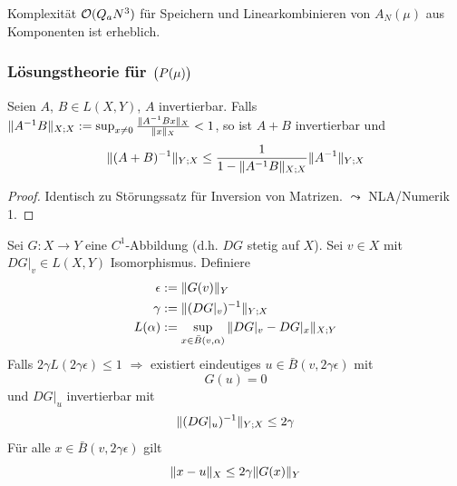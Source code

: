\begin{bem}
	Komplexität $\mathcal O(Q_a N^3)$ für Speichern und Linearkombinieren von $A_N(\mu)$ aus Komponenten ist erheblich.
\end{bem}

\subsubsection*{Lösungstheorie für $\big(P(\mu)\big)$}

\begin{satz} \label{5.3}
	Seien $A$, $B \in L(X,Y)$, $A$ invertierbar.
	Falls $\|A^{-1}B\|_{X;X} := \sup_{x \neq 0} \frac{\|A^{-1}Bx\|_X}{\|x\|_X} < 1$, so ist $A + B$ invertierbar und
	\[
		\|(A+B)^{-1}\|_{Y;X} \leq \frac{1}{1-\|A^{-1}B\|_{X;X}} \|A^{-1}\|_{Y;X}
	\]

	\begin{proof}
		Identisch zu Störungssatz für Inversion von Matrizen. $\leadsto$ NLA/Numerik 1.
	\end{proof}
\end{satz}

\begin{satz} \label{5.4}
	Sei $G: X \to Y$ eine $C^1$-Abbildung (d.h. $DG$ stetig auf $X$).
	Sei $v \in X$ mit $DG|_v \in L(X,Y)$ Isomorphismus.
	Definiere
	\begin{align*}
		\epsilon &:= \|G(v)\|_Y\\
		\gamma &:= \|(DG|_v)^{-1}\|_{Y;X}\\
		L(\alpha) &:= \sup_{x \in \bar B(v, \alpha)} \|DG|_v - DG|_x\|_{X;Y}
	\end{align*}
	Falls $2 \gamma L(2 \gamma \epsilon) \leq 1$ $\Rightarrow$ existiert eindeutiges $u \in \bar B(v,2\gamma\epsilon)$ mit
	\[
		G(u) = 0
	\]
	und $DG|_u$ invertierbar mit
	\[
		\|(DG|_u)^{-1}\|_{Y;X} \leq 2\gamma
	\]
	Für alle $x \in \bar B(v,2\gamma\epsilon)$ gilt
	\[
		\|x-u\|_X \leq 2 \gamma \|G(x)\|_Y
	\]
\end{satz}

